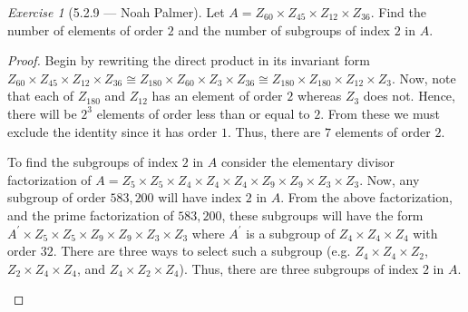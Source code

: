 \documentclass[12pt]{amsart}
\theoremstyle{remark}
\newtheorem*{exercise}{Exercise}%
\theoremstyle{mycomment}
\begin{document}
\begin{exercise}[5.2.9 --- Noah Palmer] Let $A=Z_{60}\times Z_{45}\times Z_{12}\times Z_{36}$. Find the number of elements of order $2$ and the number of subgroups of index $2$ in $A$.
\begin{proof}
Begin by rewriting the direct product in its invariant form $Z_{60}\times Z_{45}\times Z_{12}\times Z_{36}\cong Z_{180}\times Z_{60}\times Z_3\times Z_{36}\cong Z_{180}\times Z_{180}\times Z_{12}\times Z_{3}$. Now, note that each of $Z_{180}$ and $Z_{12}$ has an element of order $2$ whereas $Z_{3}$ does not. Hence, there will be $2^3$ elements of order less than or equal to $2$. From these we must exclude the identity since it has order $1$. Thus, there are $7$ elements of order $2$.

To find the subgroups of index $2$ in $A$ consider the elementary divisor factorization of $A=Z_{5}\times Z_{5}\times Z_{4}\times Z_{4}\times Z_4\times Z_{9}\times Z_{9}\times Z_3\times Z_3$. Now, any subgroup of order $583,200$ will have index $2$ in $A$. From the above factorization, and the prime factorization of $583,200$, these subgroups will have the form $A^\prime\times Z_{5}\times Z_{5}\times Z_{9}\times Z_{9}\times Z_3\times Z_3$ where $A^\prime$ is a subgroup of $Z_{4}\times Z_{4}\times Z_4$ with order $32$. There are three ways to select such a subgroup (e.g. $Z_4\times Z_4\times Z_2$, $Z_2\times Z_4\times Z_4$, and $Z_4\times Z_2\times Z_4$). Thus, there are three subgroups of index $2$ in $A$.
\begin{center}

\end{center}
\end{proof}
\end{exercise}
 
\end{document}
